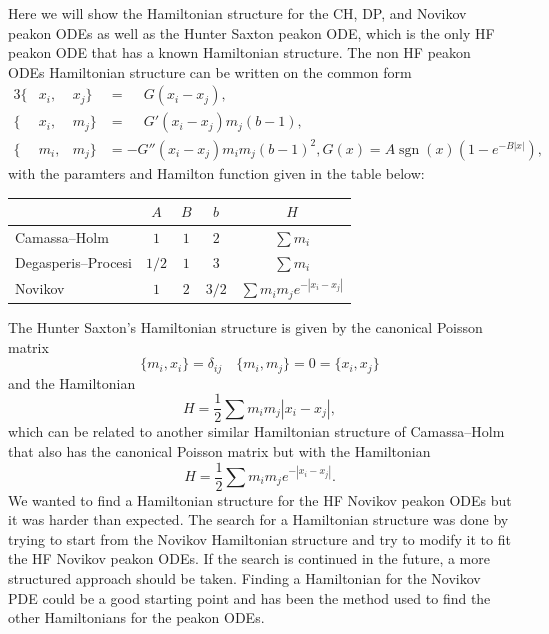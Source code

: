 \documentclass[english,master]{liumaiex}
\theoremstyle{plain}
\theoremstyle{definition}
\DeclareMathOperator{\sgn}{sgn}
\begin{document}
Here we will show the Hamiltonian structure for the CH, DP, and Novikov peakon ODEs as well as the Hunter Saxton peakon ODE, which is the only HF peakon ODE that has a known Hamiltonian structure. The non HF peakon ODEs Hamiltonian structure can be written on the common form
\begin{alignat}{3}
	\{&x_i, &x_j\} &= \phantom{-}G(x_i - x_j), \\
	\{&x_i, &m_j\} &= \phantom{-}G'(x_i - x_j)m_j (b - 1), \\
	\{&m_i, &m_j\} &=           -G''(x_i - x_j) m_i m_j (b - 1)^2,
	G(x) = A \sgn(x) (1 - e^{-B|x|}),
\end{alignat}
%
with the paramters and Hamilton function given in the table below:
\begin{center}
  \begin{tabular}{l|c|c|c|c}
    & $A$ & $B$ & $b$ & $H$ \\
    \hline
    Camassa--Holm
	& $1$ & $1$ & $2$ & $\sum m_i$ \\
    \hline
    Degasperis--Procesi
	& $1/2$ & $1$ & $3$ & $\sum m_i$ \\
    \hline
    Novikov
	& $1$ & $2$ & $3/2$ & $\sum m_i m_j e^{-|x_i - x_j|}$ \\
  \end{tabular}
\end{center}
%
The Hunter Saxton's Hamiltonian structure is given by the canonical Poisson matrix
\begin{equation}
	\{m_i, x_i\} = \delta_{ij} \quad \{m_i, m_j\} = 0 = \{x_i, x_j\}
\end{equation}
and the Hamiltonian
\begin{equation}
	H = \frac{1}{2} \sum m_i m_j |x_i - x_j|,
\end{equation}
which can be related to another similar Hamiltonian structure of Camassa--Holm that also has the canonical Poisson matrix but with the Hamiltonian 
\begin{equation}
	H = \frac{1}{2} \sum m_i m_j e^{-|x_i - x_j|}.
\end{equation}
%
We wanted to find a Hamiltonian structure for the HF Novikov peakon ODEs but it was harder than expected. The search for a Hamiltonian structure was done by trying to start from the Novikov Hamiltonian structure and try to modify it to fit the HF Novikov peakon ODEs. If the search is continued in the future, a more structured approach should be taken. Finding a Hamiltonian for the Novikov PDE could be a good starting point and has been the method used to find the other Hamiltonians for the peakon ODEs.
\end{document}
